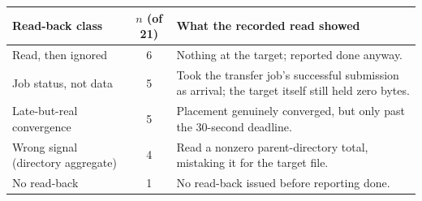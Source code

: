 \begingroup\setlength{\tabcolsep}{4pt}
\begin{tabular}{@{}p{3.4cm}c p{6.0cm}@{}}
\hline
\textbf{Read-back class} & \textbf{$n$ (of 21)} & \textbf{What the recorded read showed} \\
\hline
Read, then ignored & 6 & Nothing at the target; reported done anyway. \\[1pt]
Job status, not data & 5 & Took the transfer job's successful submission as arrival; the target itself still held zero bytes. \\[1pt]
Late-but-real convergence & 5 & Placement genuinely converged, but only past the 30-second deadline. \\[1pt]
Wrong signal (directory aggregate) & 4 & Read a nonzero parent-directory total, mistaking it for the target file. \\[1pt]
No read-back & 1 & No read-back issued before reporting done. \\
\hline
\end{tabular}
\endgroup
